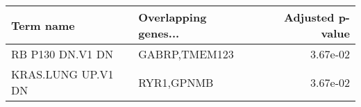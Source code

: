 \begin{tabular}{llr}
\toprule
         Term name & Overlapping genes... &  Adjusted p-value \\
\midrule
  RB P130 DN.V1 DN &        GABRP,TMEM123 &          3.67e-02 \\
KRAS.LUNG UP.V1 DN &           RYR1,GPNMB &          3.67e-02 \\
\bottomrule
\end{tabular}
